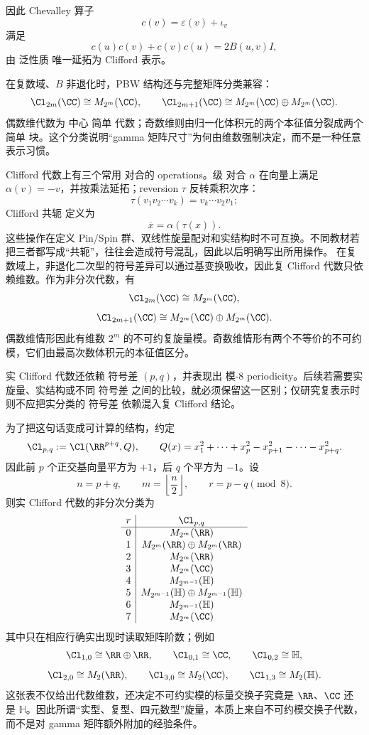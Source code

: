 因此 Chevalley 算子
\begin{equation*}c(v)=\varepsilon(v)+\iota_v\end{equation*}
满足
\[
c(u)c(v)+c(v)c(u)=2B(u,v)I,
\]
由 泛性质 唯一延拓为 Clifford 表示。

在复数域、$B$ 非退化时，PBW 结构还与完整矩阵分类兼容：
\[
\Cl_{2m}(\CC)\cong M_{2^m}(\CC),
\qquad
\Cl_{2m+1}(\CC)
\cong M_{2^m}(\CC)\oplus M_{2^m}(\CC).
\]
偶数维代数为 中心 简单 代数；奇数维则由归一化体积元的两个本征值分裂成两个 简单 块。这个分类说明“gamma 矩阵尺寸”为何由维数强制决定，而不是一种任意表示习惯。

Clifford 代数上有三个常用 对合的 operations。级 对合 $\alpha$ 在向量上满足 $\alpha(v)=-v$，并按乘法延拓；reversion $\tau$ 反转乘积次序：
\[
\tau(v_1v_2\cdots v_k)
=v_k\cdots v_2v_1;
\]
Clifford 共轭 定义为
\[
\overline x=\alpha(\tau(x)).
\]
这些操作在定义 Pin/Spin 群、双线性旋量配对和实结构时不可互换。不同教材若把三者都写成“共轭”，往往会造成符号混乱，因此以后明确写出所用操作。
在复数域上，非退化二次型的符号差异可以通过基变换吸收，因此复 Clifford 代数只依赖维数。作为非分次代数，有
\[
\Cl_{2m}(\CC)
\cong M_{2^m}(\CC),
\]
\[
\Cl_{2m+1}(\CC)
\cong M_{2^m}(\CC)\oplus M_{2^m}(\CC).
\]
偶数维情形因此有维数 $2^m$ 的不可约复旋量模。奇数维情形有两个不等价的不可约模，它们由最高次数体积元的本征值区分。

实 Clifford 代数还依赖 符号差 $(p,q)$，并表现出 模-8 periodicity。后续若需要实旋量、实结构或不同 符号差 之间的比较，就必须保留这一区别；仅研究复表示时则不应把实分类的 符号差 依赖混入复 Clifford 结论。

为了把这句话变成可计算的结构，约定
\[
\Cl_{p,q}:=\Cl(\RR^{p+q},Q),
\qquad
Q(x)=x_1^2+\cdots+x_p^2-x_{p+1}^2-\cdots-x_{p+q}^2.
\]
因此前 $p$ 个正交基向量平方为 $+1$，后 $q$ 个平方为 $-1$。设
\[
n=p+q,
\qquad
m=\left\lfloor\frac n2\right\rfloor,
\qquad
r=p-q\pmod 8.
\]
则实 Clifford 代数的非分次分类为
\begin{equation}
\begin{array}{c|c}
r & \Cl_{p,q} \\
\hline
0 & M_{2^m}(\RR)\\
1 & M_{2^m}(\RR)\oplus M_{2^m}(\RR)\\
2 & M_{2^m}(\RR)\\
3 & M_{2^m}(\CC)\\
4 & M_{2^{m-1}}(\mathbb H)\\
5 & M_{2^{m-1}}(\mathbb H)\oplus M_{2^{m-1}}(\mathbb H)\\
6 & M_{2^{m-1}}(\mathbb H)\\
7 & M_{2^m}(\CC)
\end{array}
\label{eq:real-clifford-classification}
\end{equation}
其中只在相应行确实出现时读取矩阵阶数；例如
\[
\Cl_{1,0}\cong\RR\oplus\RR,
\qquad
\Cl_{0,1}\cong\CC,
\qquad
\Cl_{0,2}\cong\mathbb H,
\]
\[
\Cl_{2,0}\cong M_2(\RR),
\qquad
\Cl_{3,0}\cong M_2(\CC),
\qquad
\Cl_{1,3}\cong M_2(\mathbb H).
\]
这张表不仅给出代数维数，还决定不可约实模的标量交换子究竟是 $\RR$、$\CC$ 还是 $\mathbb H$。因此所谓“实型、复型、四元数型”旋量，本质上来自不可约模交换子代数，而不是对 gamma 矩阵额外附加的经验条件。

